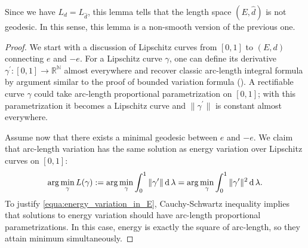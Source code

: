 Since we have $ L_d = L_{\hat{d}}$,
this lemma tells that the length space $(E, \hat{d})$ is not geodesic.
In this sense, this lemma is a non-smooth version of the previous one.

\begin{proof}
	We start with a discussion of Lipschitz curves from $[0,1]$ to $(E,d)$ connecting $e$ and $-e$.
	For a Lipschitz curve $\gamma$,
	one can define its derivative $\gamma^\prime: [0,1] \rightarrow \mathbb{R}^\mathbb{N}$ almost everywhere
	and recover classic arc-length integral formula by argument similar to the proof of bounded variation formula
	(\cite[Section 5.3]{Bogachev2007}).
	A rectifiable curve $\gamma$ could take arc-length proportional parametrization on $[0,1]$;
	with this parametrization
	it becomes a Lipschitz curve and $\| \gamma^\prime \|$ is constant almost everywhere.

	Assume now that there exists a minimal geodesic between $e$ and $-e$.
	We claim that arc-length variation has the same solution as energy variation
	over Lipschitz curves on $[0,1]$:
	\begin{equation}
		\label{equa:energy_variation_in_E}
		\arg \min_{\gamma} L (\gamma) :=
		\arg \min_{\gamma} \int_{0}^{1} \| \gamma^\prime \| \operatorname{d} \lambda =
		\arg \min_{\gamma} \int_{0}^{1} \| \gamma^\prime \| ^2 \operatorname{d} \lambda.
	\end{equation}
	To justify \cref{equa:energy_variation_in_E},
	Cauchy-Schwartz inequality implies that
	solutions to energy variation should have arc-length proportional parametrizations.
	In this case, energy is exactly the square of arc-length, so they attain minimum simultaneously.


\end{proof}
